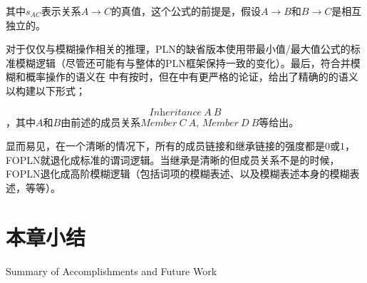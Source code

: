 其中$s_{AC}$表示关系$A\rightarrow C$的真值，这个公式的前提是，假设$A\rightarrow B$和$B\rightarrow C$是相互独立的。

对于仅仅与模糊操作相关的推理，PLN的缺省版本使用带最小值/最大值公式的标准模糊逻辑（尽管还可能有与整体的PLN框架保持一致的变化）。最后，符合并模糊和概率操作的语义在\cite{Goertzel2008} 中有按时，但在\cite{Goertzel2010e}中有更严格的论证，给出了精确的的语义以构建以下形式；

$$
\textit{Inheritance} \ A \  B
$$，其中$A$和$B$由前述的成员关系$\textit{Member}\ C\ A$, $\textit{Member}\ D\ B$等给出。

显而易见，在一个清晰的情况下，所有的成员链接和继承链接的强度都是$0$或$1$，FOPLN就退化成标准的谓词逻辑。当继承是清晰的但成员关系不是的时候，FOPLN退化成高阶模糊逻辑（包括词项的模糊表述、以及模糊表述本身的模糊表述，等等）。




\section{本章小结}{Summary of Accomplishments and Future Work}

